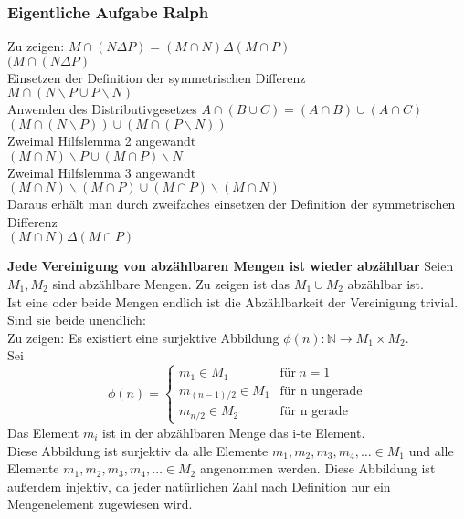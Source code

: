 \subsubsection*{Eigentliche Aufgabe Ralph}
Zu zeigen: \(M \cap (N \Delta P) = (M \cap N) \Delta (M \cap P) \) \\
\((M \cap (N \Delta P)\) \\
Einsetzen der Definition der symmetrischen Differenz \\
\(M \cap (N \backslash P \cup P \backslash N)\) \\
Anwenden des Distributivgesetzes \(A \cap (B \cup C) = (A \cap B ) \cup (A \cap C)\) \\
\((M \cap (N \backslash P)) \cup (M \cap (P \backslash N)) \) \\
Zweimal Hilfslemma 2 angewandt \\
\((M \cap N) \backslash P \cup (M \cap P) \backslash N \) \\
Zweimal Hilfslemma 3 angewandt \\
\((M \cap N) \backslash (M \cap P) \cup (M \cap P) \backslash (M \cap N) \) \\
Daraus erhält man durch zweifaches einsetzen der Definition der symmetrischen Differenz \\
\((M \cap N) \Delta (M \cap P)\)

\begin{lemma}
    \textbf{Jede Vereinigung von abzählbaren Mengen ist wieder abzählbar}
    Seien \(M_1, M_2\) sind abzählbare Mengen. Zu zeigen ist das \(M_1 \cup M_2\) abzählbar ist. \\
    Ist eine oder beide Mengen endlich ist die Abzählbarkeit der Vereinigung trivial.
    Sind sie beide unendlich: \\
    Zu zeigen: Es existiert eine surjektive Abbildung \(\phi(n): \mathbb{N} \to M_1 \times M_2 \). \\
    Sei 
    \begin{equation*}
        \phi(n) =
        \begin{cases}
            m_1 \in M_1 & \text{für} \: n = 1 \\
            m_{(n-1)/2} \in M_1 & \text{für n ungerade} \\
            m_{n/2} \in M_2 & \text{für n gerade}
        \end{cases}
    \end{equation*}
    Das Element \(m_i\) ist in der abzählbaren Menge das i-te Element. \\
    Diese Abbildung ist surjektiv da alle Elemente \(m_1, m_2, m_3, m_4, \ldots \in M_1\) und alle Elemente \(m_1, m_2, m_3, m_4, \ldots \in M_2\) angenommen werden.
    Diese Abbildung ist außerdem injektiv, da jeder natürlichen Zahl nach Definition nur ein Mengenelement zugewiesen wird.

\end{lemma}